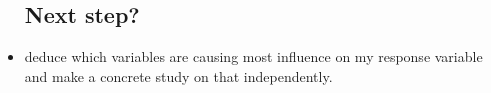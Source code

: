 \documentclass[
  letterpaper,
  DIV=11,
  numbers=noendperiod]{scrartcl}
\begin{document}
\begin{itemize}
  \hypertarget{next-step}{%
  \subsection{Next step?}\label{next-step}}
\item
  deduce which variables are causing most influence on my response
  variable and make a concrete study on that independently.
\end{itemize}
\end{document}
